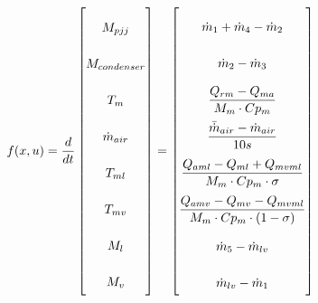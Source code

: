 \begin{equation} \label{eq:f_noSub} \renewcommand{\arraystretch}{2.4}
	f(x,u) =  \dfrac{d}{dt} \begin{bmatrix}
		M_{pjj}		\\					%
		M_{condenser} 	\\				%
		T_m 			\\				%
		\dot{m}_{air}	\\				%
		T_{ml}			\\				%
		T_{mv}			\\				%
		M_l				\\				%
		M_v				\\				%
	\end{bmatrix}
	=
	\begin{bmatrix}
		\dot{m}_1 + \dot{m}_4 - \dot{m}_2 \\										%
		\dot{m}_{2} - \dot{m}_{3}	\\												%
		\dfrac{Q_{rm} - Q_{ma}}{M_m \cdot Cp_m} \\									%
		\dfrac{\bar{\dot{m}}_{air}  - \dot{m}_{air}} {10s}		\\					%
		\dfrac{Q_{aml}-Q_{ml} + Q_{mvml}}{M_m \cdot Cp_m \cdot \sigma}        \\	%
		\dfrac{Q_{amv} - Q_{mv} - Q_{mvml}}{M_m \cdot Cp_m \cdot (1- \sigma)}	\\	%
		\dot{m}_{5} - \dot{m}_{lv}		\\											%
		\dot{m}_{lv} - \dot{m}_{1}	\\												%
	\end{bmatrix}
\end{equation}






